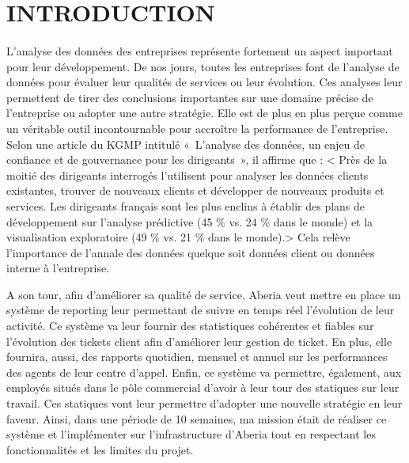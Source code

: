 \documentclass[a4paper,12pt]{report}
\begin{document}
\vfill

\newpage



\setcounter{tocdepth}{2}
\renewcommand{\contentsname}{Sommaire}
\tableofcontents

\newpage
\section{INTRODUCTION}
\paragraph*{}

              L'analyse des données des entreprises représente fortement un aspect important pour leur développement. De  nos jours, toutes les entreprises font de l'analyse de données pour évaluer leur qualités de services ou leur évolution. Ces analyses leur permettent de tirer des conclusions importantes sur une domaine précise de l’entreprise ou adopter une autre stratégie. Elle est de plus en plus perçue comme un véritable outil incontournable pour accroître  la performance de l’entreprise. Selon une article du KGMP  intitulé « L’analyse des données, un enjeu de confiance et de gouvernance pour les dirigeants », il affirme que : < Près de la moitié des dirigeants interrogés l’utilisent pour analyser les données clients existantes, trouver de nouveaux clients et développer de nouveaux produits et services. Les dirigeants français sont les plus enclins à établir des plans de développement sur l’analyse prédictive (45 \% vs. 24 \% dans le monde) et la visualisation exploratoire (49 \% vs. 21 \% dans le monde).> Cela relève l’importance de l’annale des données quelque soit données client ou données interne à l’entreprise.\newline\newline 
       
       A son tour, afin  d’améliorer sa qualité de service, Aberia veut mettre en place un système de reporting leur permettant de suivre en temps réel l'évolution de leur activité.  Ce système va leur fournir des statistiques cohérentes et fiables sur l'évolution des tickets client afin d'améliorer leur gestion de ticket. En plus, elle fournira, aussi, des rapports quotidien, mensuel  et annuel sur les performances des agents de leur centre d’appel. Enfin, ce système va permettre, également, aux employés situés dans le pôle commercial d’avoir à leur tour des statiques sur leur travail. Ces statiques vont leur permettre d’adopter une nouvelle stratégie en leur faveur. Ainsi, dans une période de 10 semaines, ma mission était de réaliser ce système et l'implémenter sur l’infrastructure d’Aberia tout en respectant les fonctionnalités et les limites du projet. 
\newpage
\end{document}
